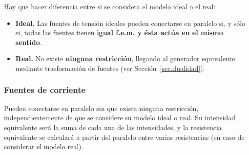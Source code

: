 		Hay que hacer diferencia entre si se considera el
                modelo ideal o el real:
		\begin{itemize}
                \item \textbf{Ideal.} Las fuentes de tensión ideales
                  pueden conectarse en paralelo si, y sólo si, todas
                  las fuentes tienen \textbf{igual f.e.m. y ésta actúa
                    en el mismo sentido}.
                \item \textbf{Real.} No existe \textbf{ninguna
                    restricción}, llegando al generador equivalente
                  mediante trasformación de fuentes (ver
                  Sección~\ref{sec.dualidad}).
		\end{itemize}
		
		\subsubsection{Fuentes de corriente}
		
		Pueden conectarse en paralelo sin que exista ninguna
                restricción, independientemente de que se considere su
                modelo ideal o real. Su intensidad equivalente será la
                suma de cada una de las intensidades, y la resistencia
                equivalente se calculará a partir del paralelo entre
                varias resistencias (en caso de considerar el modelo
                real).
	
